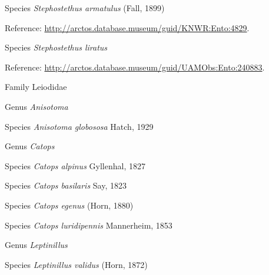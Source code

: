 \documentclass[9pt, article]{memoir}
\begin{document}
\begin{multicols}{2}
\vspace{6pt}\noindent\hspace{36pt}Species \textit{Stephostethus armatulus} (Fall, 1899)


\vspace{6pt}Reference: 
\url{http://arctos.database.museum/guid/KNWR:Ento:4829}.

\vspace{6pt}\noindent\hspace{36pt}Species \textit{Stephostethus liratus}


\vspace{6pt}Reference: 
\url{http://arctos.database.museum/guid/UAMObs:Ento:240883}.

\vspace{6pt}\noindent\hspace{24pt}Family Leiodidae


\vspace{6pt}\noindent\hspace{30pt}Genus \textit{Anisotoma}


\vspace{6pt}\noindent\hspace{36pt}Species \textit{Anisotoma globososa} Hatch, 1929


\vspace{6pt}\noindent\hspace{30pt}Genus \textit{Catops}


\vspace{6pt}\noindent\hspace{36pt}Species \textit{Catops alpinus} Gyllenhal, 1827


\vspace{6pt}\noindent\hspace{36pt}Species \textit{Catops basilaris} Say, 1823


\vspace{6pt}\noindent\hspace{36pt}Species \textit{Catops egenus} (Horn, 1880)


\vspace{6pt}\noindent\hspace{36pt}Species \textit{Catops luridipennis} Mannerheim, 1853


\vspace{6pt}\noindent\hspace{30pt}Genus \textit{Leptinillus}


\vspace{6pt}\noindent\hspace{36pt}Species \textit{Leptinillus validus} (Horn, 1872)



\end{multicols}
\end{document}
